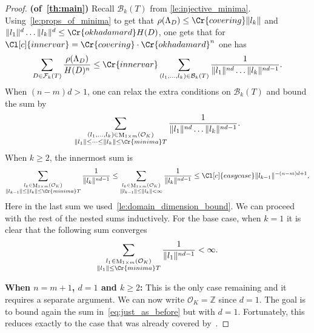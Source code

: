 \documentclass{amsart}
\theoremstyle{definition}
\theoremstyle{remark}
\newcommand{\OK}{\mathcal{O}_K}
\DeclareMathOperator{\M}{M}
\begin{document}
\begin{proof} {\bf (of~\cref{th:main})}
    Recall $\mathcal{B}_{k}(T)$ from \cref{le:injective_minima}. Using~\cref{le:props_of_minima} to get that
    $\rho(\Lambda_{D}) \leq \Cr{covering} \|l_{k}\|$ and $\|l_{1}\|^{d}\dots \|l_{k}\|^{d} \leq \Cr{okhadamard} H(D)$, 
    one gets that for $\Cl[c]{innervar}= \Cr{covering} \cdot \Cr{okhadamard}^{n}$ one has
    \begin{equation}
    \sum_{D \in \mathcal{F}_{k}(T)} \frac{\rho(\Lambda_{D})}{H(D)^{n}} 
    \leq 
    \Cr{innervar}
    \sum_{(l_{1},\dots,l_{k}) \in \mathcal{B}_{k}(T)}^{} \frac{1}{\|l_{1}\|^{nd} \dots \|l_{k}\|^{nd-1}}.
    \label{eq:just_as_before}
    \end{equation}
    When $(n-m)d > 1$, one can relax the extra conditions on $\mathcal{B}_{k}(T)$ and bound the sum by 
    \begin{equation}
    \sum_{\substack{(l_{1},\dots,l_{k}) \in  \M_{1 \times m}(\OK) \\  \|l_{1}\|  \leq \dots \leq \|l_{k}\| \leq  \Cr{minima} T  }   }^{} \frac{1}{\|l_{1}\|^{nd} \dots \|l_{k}\|^{nd-1}}.
    \end{equation}
    When $k \geq 2$, the innermost sum is 
    \begin{equation}
    \sum_{\substack{ l_k\in  \M_{1 \times m}(\OK) \\  \|l_{k-1}\|  \leq \|l_{k}\| \leq  \Cr{minima} T  }   }^{} \frac{1}{\|l_{k}\|^{nd-1}} \leq 
    \sum_{\substack{ l_k\in  \M_{1 \times m}(\OK) \\  \|l_{k-1}\|  \leq \|l_{k}\| < \infty}   }^{} \frac{1}{\|l_{k}\|^{nd-1}} \leq \Cl[c]{easycase} \|l_{k-1}\|^{-(n-m)d+1},
    \end{equation}
    Here in the last sum we used~\cref{le:domain_dimension_bound}. 
    We can proceed with the rest of the nested sums inductively. For the base case, when $k=1$ it is clear that the following sum converges
    \begin{equation}
    \sum_{\substack{ l_1\in  \M_{1 \times m}(\OK) \\  \|l_{1}\| \leq  \Cr{minima} T  }   }^{} \frac{1}{\|l_{1}\|^{nd-1}} < \infty.
    \end{equation}

    
    {\bf When $n=m+1$, $d=1$ and $k \geq 2$:}
This is the only case remaining and it requires a separate argument. 
We can now write $\mathcal{O}_{K} = \mathbb{Z}$ since $d=1$.
The goal is to bound again the sum in~\cref{eq:just_as_before} but with $d=1$.
Fortunately, this reduces exactly to the case that was already covered by~\cite[\S 4]{K1994}.


\end{proof}
\end{document}
